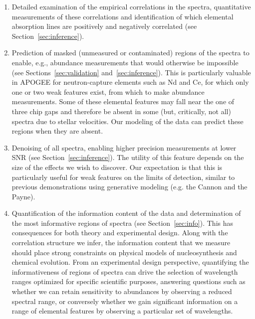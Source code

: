 \documentclass[a4paper,fleqn,usenatbib]{mnras}
\newcommand{\smf}[1]{\textbf{\textcolor{blue}{SMF: #1}}}
\begin{document}
\begin{enumerate}
\item Detailed examination of the empirical correlations in the spectra, quantitative measurements of these correlations and identification of which elemental absorption lines are positively and negatively correlated (see Section~\ref{sec:inference}). %
\item Prediction of masked (unmeasured or contaminated) regions of the spectra to enable, e.g., abundance measurements that would otherwise be impossible (see Sections~\ref{sec:validation} and~\ref{sec:inference}). This is particularly valuable in APOGEE for neutron-capture elements such as Nd and Ce, for which only one or two weak features exist, from which to make abundance measurements. %
Some of these elemental features may fall near the one of three chip gaps and therefore be absent in some (but, critically, not all) spectra due to stellar velocities. Our modeling of the data can predict these regions when they are absent. 
\item Denoising of all spectra, enabling higher precision measurements at lower SNR (see Section~\ref{sec:inference}). The utility of this feature depends on the size of the effects we wish to discover. Our expectation is that this is particularly useful for weak features on the limits of detection, similar to previous demonstrations using generative modeling (e.g. the Cannon and the Payne). 
\item Quantification of the information content of the data and determination of the most informative regions of spectra (see Section~\ref{sec:info}). This has consequences for both theory and experimental design. Along with the correlation structure we infer, the information content that we measure should place strong constraints on physical models of nucleosynthesis and chemical evolution. From an experimental design perspective, quantifying the informativeness of regions of spectra can drive the selection of wavelength ranges optimized for specific scientific purposes, answering questions such as whether we can retain sensitivity to abundances by observing a reduced spectral range, or conversely whether we gain significant information on a range of elemental features by observing a particular set of wavelengths.
\end{enumerate}
\end{document}
